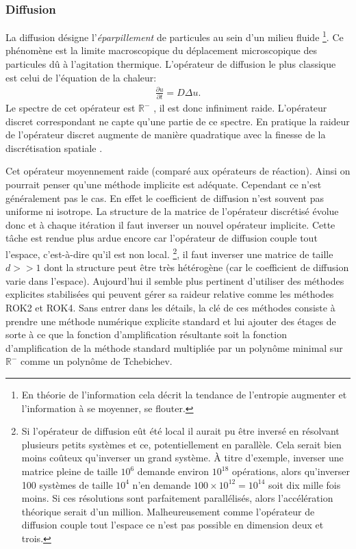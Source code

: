 \subsubsection{Diffusion}
    La diffusion désigne l'\textit{éparpillement} de particules au sein d'un milieu fluide
    \footnote{En théorie de l'information cela décrit la tendance de l'entropie augmenter et l'information à se moyenner, se flouter.}.
    Ce phénomène est la limite macroscopique du déplacement microscopique
    des particules dû à l'agitation thermique. L'opérateur de diffusion le plus classique est celui de l'équation de la chaleur:
    \begin{align} \frac{\partial u}{\partial t} = D \Delta u.\end{align}
    Le spectre de cet opérateur est $\mathbb R^-$ \cite{}, il est donc infiniment raide. 
    L'opérateur discret correspondant ne capte qu'une partie de ce spectre.
    En pratique la raideur de l'opérateur discret augmente de manière quadratique avec la finesse de la discrétisation spatiale \cite{}.\par
    Cet opérateur moyennement raide (comparé aux opérateurs de réaction). Ainsi on pourrait penser qu'une méthode implicite est adéquate. Cependant ce n'est généralement pas le cas.
    En effet le coefficient de diffusion n'est souvent pas uniforme ni isotrope. La structure de la matrice de l'opérateur discrétisé évolue donc et
    à chaque itération il faut inverser un nouvel opérateur implicite. Cette tâche est rendue plus ardue encore car l'opérateur de diffusion couple tout l'espace,
    c'est-à-dire qu'il est non local.
    \footnote{Si l'opérateur de diffusion eût été local il aurait pu être inversé en résolvant plusieurs petits systèmes et ce, potentiellement en parallèle.
    Cela serait bien moins coûteux qu'inverser un grand système. 
    À titre d'exemple, inverser une matrice pleine de taille $10^6$ demande environ $10^{18}$ opérations, alors qu'inverser 100 systèmes de taille $10^4$
    n'en demande $100 \times 10^{12} = 10^{14}$ soit dix mille fois moins. Si ces résolutions sont parfaitement parallélisés, alors l'accélération théorique serait d'un million. Malheureusement comme
    l'opérateur de diffusion couple tout l'espace ce n'est pas possible en dimension deux et trois.},
    il faut inverser une matrice de taille $d >> 1$ dont la structure
    peut être très hétérogène (car le coefficient de diffusion varie dans l'espace). Aujourd'hui il semble plus pertinent
    d'utiliser des méthodes explicites stabilisées qui peuvent gérer sa raideur relative comme les méthodes 
    ROK2 et ROK4\cite{abdulle2002fourth}. Sans entrer dans les détails, la clé de ces méthodes consiste à prendre une méthode numérique explicite standard et lui ajouter des étages 
    de sorte à ce que la fonction d'amplification résultante soit la fonction d'amplification de la méthode standard multipliée par un polynôme minimal sur $\mathbb R^-$
    comme un polynôme de Tchebichev.


